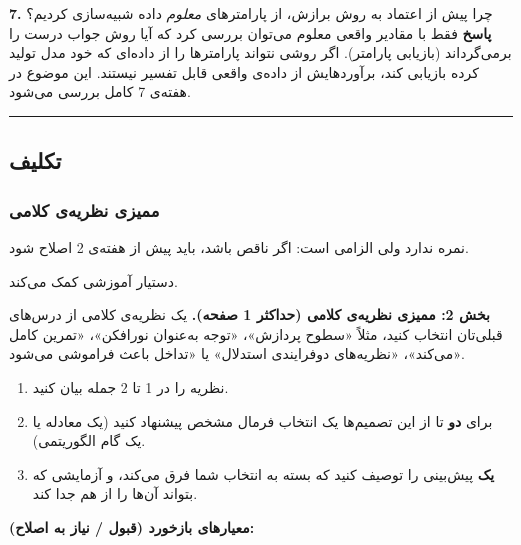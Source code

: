 \textbf{7.} چرا پیش از اعتماد به روش برازش، از پارامترهای \emph{معلوم}
داده شبیه‌سازی کردیم؟ \textbf{پاسخ} فقط با مقادیر واقعی معلوم می‌توان
بررسی کرد که آیا روش جواب درست را برمی‌گرداند (بازیابی پارامتر). اگر روشی
نتواند پارامترها را از داده‌ای که خود مدل تولید کرده بازیابی کند،
برآوردهایش از داده‌ی واقعی قابل تفسیر نیستند. این موضوع در هفته‌ی 7 کامل
بررسی می‌شود.

\begin{center}\rule{0.5\linewidth}{0.5pt}\end{center}


\subsection{تکلیف}

\subsubsection{\texorpdfstring{ممیزی نظریه‌ی کلامی}{A0: ممیزی نظریه‌ی کلامی}}

 نمره ندارد ولی الزامی است: اگر  ناقص باشد، باید پیش از
 هفته‌ی 2 اصلاح شود.

دستیار آموزشی کمک می‌کند.

\textbf{بخش 2: ممیزی نظریه‌ی کلامی (حداکثر 1 صفحه).} یک نظریه‌ی کلامی از
درس‌های قبلی‌تان انتخاب کنید، مثلاً «سطوح پردازش»، «توجه به‌عنوان نورافکن»،
«تمرین کامل می‌کند»، «نظریه‌های دوفرایندی استدلال» یا «تداخل باعث فراموشی
می‌شود».

\begin{enumerate}
\def\labelenumi{\arabic{enumi}.}
\tightlist
\item
  نظریه را در 1 تا 2 جمله بیان کنید.
\item
  برای \textbf{دو} تا از این تصمیم‌ها یک انتخاب فرمال مشخص پیشنهاد کنید
  (یک معادله یا یک گام الگوریتمی).
\item
  \textbf{یک} پیش‌بینی را توصیف کنید که بسته به انتخاب شما فرق می‌کند، و
  آزمایشی که بتواند آن‌ها را از هم جدا کند.
\end{enumerate}

\textbf{معیارهای بازخورد (قبول / نیاز به اصلاح):}


